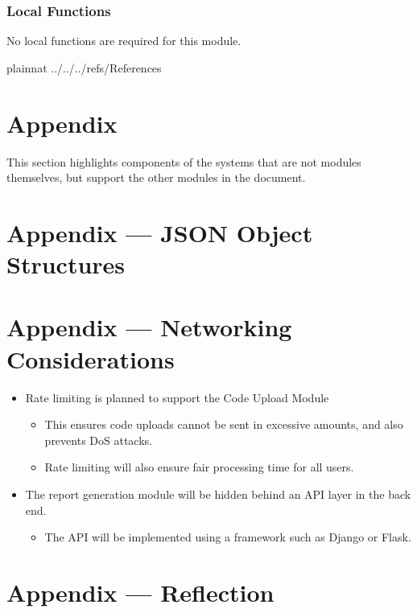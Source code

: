 \documentclass[12pt, titlepage]{article}
\begin{document}
\subsubsection{Local Functions}
No local functions are required for this module.

\newpage

 {plainnat}
 {../../../refs/References}

\newpage

\section{Appendix} \label{Appendix}
This section highlights components of the systems that are not modules themselves, but support the other modules in the document.

\section*{Appendix --- JSON Object Structures}

\section*{Appendix --- Networking Considerations}
\begin{itemize}
    \item Rate limiting is planned to support the Code Upload Module
    \begin{itemize}
        \item This ensures code uploads cannot be sent in excessive amounts, and also prevents DoS attacks.
        \item Rate limiting will also ensure fair processing time for all users.
    \end{itemize}
    \item The report generation module will be hidden behind an API layer in the back end.
    \begin{itemize}
        \item The API will be implemented using a framework such as Django or Flask.
    \end{itemize}
\end{itemize}

\section*{Appendix --- Reflection}
\end{document}
